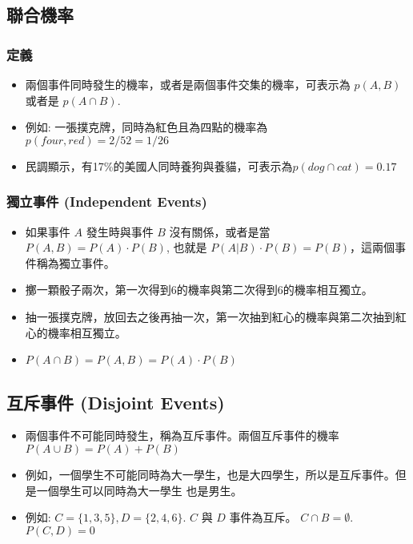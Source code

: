 \documentclass{beamer}
\begin{document}
\subsection{聯合機率 }
\begin{frame}\frametitle{定義}
\begin{itemize}
\item 兩個事件同時發生的機率，或者是兩個事件交集的機率，可表示為 $p(A,B)$ 或者是 $p(A\cap B)$.
\item 例如: 一張撲克牌，同時為紅色且為四點的機率為$p(four, red)=2/52=1/26$
\item 民調顯示，有17\%的美國人同時養狗與養貓，可表示為$p(dog\cap cat)=0.17$
\end{itemize}
\end{frame}
\begin{frame}\frametitle{獨立事件 (Independent Events)}
\begin{itemize}
\item 如果事件 $A$ 發生時與事件 $B$ 沒有關係，或者是當 $P(A,B)=P(A)\cdot P(B)$, 也就是 $P(A|B)\cdot P(B)=P(B)$，這兩個事件稱為獨立事件。
\item 擲一顆骰子兩次，第一次得到6的機率與第二次得到6的機率相互獨立。
\item 抽一張撲克牌，放回去之後再抽一次，第一次抽到紅心的機率與第二次抽到紅心的機率相互獨立。
\item $P(A\cap B)=P(A,B)=P(A)\cdot P(B)$ 
\end{itemize}
\end{frame}

\subsection{互斥事件 (Disjoint Events)}
\begin{frame}
\begin{itemize}
\item 兩個事件不可能同時發生，稱為互斥事件。兩個互斥事件的機率 $P(A\cup B)=P(A)+P(B)$
\item 例如，一個學生不可能同時為大一學生，也是大四學生，所以是互斥事件。但是一個學生可以同時為大一學生
也是男生。
\item 例如: $C=\{1,3,5\}, D=\{2,4,6\}$. $C$ 與 $D$ 事件為互斥。 $C\cap B=\emptyset$. $P(C,D)=0$
\end{itemize}
\end{frame}
\end{document}
